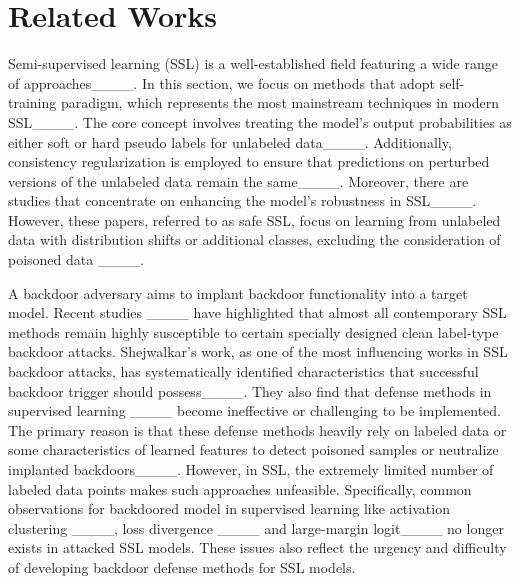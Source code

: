 \section{Related Works}
Semi-supervised learning (SSL) is a well-established field featuring a wide range of approaches____. In this section, we focus on methods that adopt self-training paradigm, which represents the most mainstream techniques in modern SSL____. The core concept involves treating the model's output probabilities as either soft or hard pseudo labels for unlabeled data____. Additionally, consistency regularization is employed to ensure that predictions on perturbed versions of the unlabeled data remain the same____. Moreover, there are studies that concentrate on enhancing the model's robustness in SSL____. However, these papers, referred to as safe SSL, focus on learning from unlabeled data with distribution shifts or additional classes, excluding the consideration of poisoned data ____.

A backdoor adversary aims to implant backdoor functionality into a target model. Recent studies ____ have highlighted that almost all contemporary SSL methods remain highly susceptible to certain specially designed clean label-type backdoor attacks. Shejwalkar's work, as one of the most influencing works in SSL backdoor attacks, has systematically identified characteristics that successful backdoor trigger should possess____. They also find that defense methods in supervised learning ____ become ineffective or challenging to be implemented. The primary reason is that these defense methods heavily rely on labeled data or some characteristics of learned features to detect poisoned samples or neutralize implanted backdoors____. However, in SSL, the extremely limited number of labeled data points makes such approaches unfeasible. Specifically, common observations for backdoored model in supervised learning like activation clustering ____, loss divergence ____ and large-margin logit____ no longer exists in attacked SSL models. These issues also reflect the urgency and difficulty of developing backdoor defense methods for SSL models.